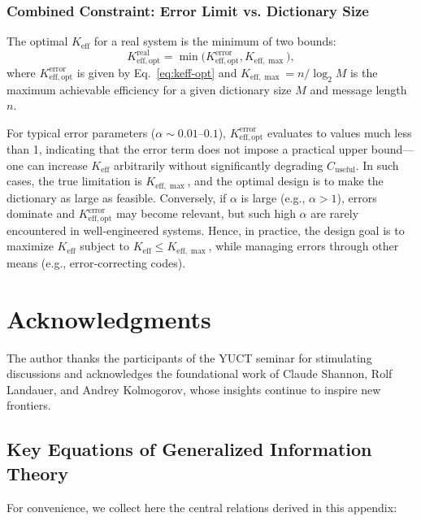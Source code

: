\documentclass[12pt,a4paper]{article}
\theoremstyle{remark}
\newcommand{\Keff}{K_{\mathrm{eff}}}
\newcommand{\Keffopt}{K_{\mathrm{eff},\mathrm{opt}}}
\newcommand{\Keffmax}{K_{\mathrm{eff},\max}}
\begin{document}
	\subsubsection{Combined Constraint: Error Limit vs. Dictionary Size}
	The optimal $\Keff$ for a real system is the minimum of two bounds:
	\[
	\Keffopt^{\text{real}} = \min\bigl( \Keffopt^{\text{error}}, \Keffmax \bigr),
	\]
	where $\Keffopt^{\text{error}}$ is given by Eq.~\eqref{eq:keff-opt} and $\Keffmax = n / \log_2 M$ is the maximum achievable efficiency for a given dictionary size $M$ and message length $n$.
	
	For typical error parameters ($\alpha \sim 0.01$–$0.1$), $\Keffopt^{\text{error}}$ evaluates to values much less than 1, indicating that the error term does not impose a practical upper bound—one can increase $\Keff$ arbitrarily without significantly degrading $C_{\text{useful}}$. In such cases, the true limitation is $\Keffmax$, and the optimal design is to make the dictionary as large as feasible. Conversely, if $\alpha$ is large (e.g., $\alpha > 1$), errors dominate and $\Keffopt^{\text{error}}$ may become relevant, but such high $\alpha$ are rarely encountered in well‑engineered systems. Hence, in practice, the design goal is to maximize $\Keff$ subject to $\Keff \le \Keffmax$, while managing errors through other means (e.g., error‑correcting codes).
	
	\section*{Acknowledgments}
	
	The author thanks the participants of the YUCT seminar for stimulating discussions and acknowledges the foundational work of Claude Shannon, Rolf Landauer, and Andrey Kolmogorov, whose insights continue to inspire new frontiers.
	
	\subsection*{Key Equations of Generalized Information Theory}
	For convenience, we collect here the central relations derived in this appendix:
	
\end{document}
